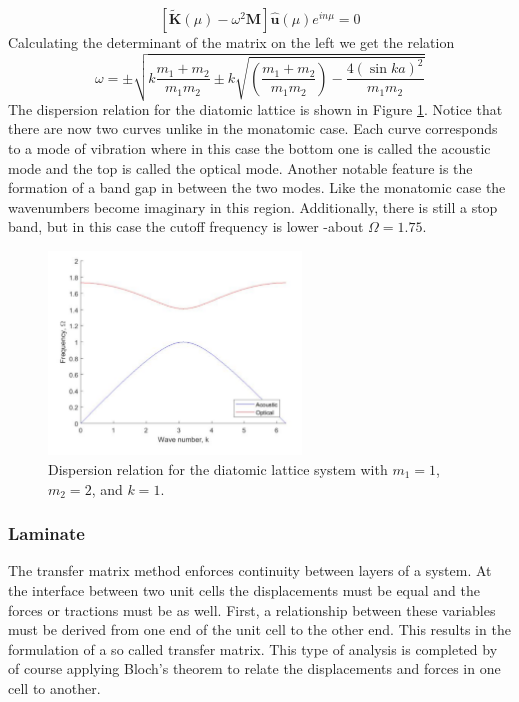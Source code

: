 \documentclass{article}
\begin{document}
\begin{equation}
\left[\mathbf{\tilde{K}}(\mu) -\omega^2 \mathbf{M} \right] 
\mathbf{\hat{u}}(\mu)e^{in\mu} = 0
\end{equation}
Calculating the determinant of the matrix on the left we get the relation
\begin{equation}
\omega =\pm \sqrt{k\frac{m_1+m_2}{m_1m_2} \pm k 
\sqrt{\left(\frac{m_1+m_2}{m_1m_2}\right) - \frac{4(\sin{ka})^2}{m_1m_2}}}
\end{equation}
The dispersion relation for the diatomic lattice is shown in Figure 
\ref{fig:dia-exact}. Notice that there are now two curves unlike in the 
monatomic case. Each curve corresponds to a mode of vibration where in this 
case the bottom one is called the acoustic mode and the top is called the 
optical mode. Another notable feature is the formation of a band gap in between 
the two modes. Like the monatomic case the wavenumbers become imaginary in this 
region. Additionally, there is still a stop band, but in this case the cutoff 
frequency is lower -about $\Omega = 1.75$.
\begin{figure}[!htbp]
	\centering
	\includegraphics[width=0.6\textwidth]{diatomic-exact.pdf}
	\caption{Dispersion relation for the diatomic lattice system with 
	$m_1=1$, $m_2=2$, and $k=1$.}
	\label{fig:dia-exact}
\end{figure}

\subsubsection{Laminate}
The transfer matrix method enforces continuity between layers of a system. At 
the interface between two unit cells the displacements must be equal and the 
forces or tractions must be as well. First, a relationship between these 
variables must be derived from one end of the unit cell to the other end. This 
results in the formulation of a so called transfer matrix. This type of 
analysis is completed by of course applying Bloch's theorem to relate the 
displacements and forces in one cell to another.
\end{document}
